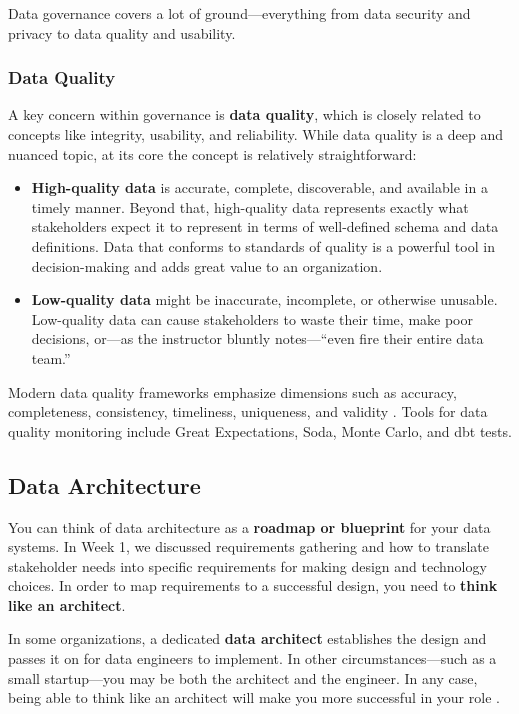 \documentclass{article}
\begin{document}
Data governance covers a lot of ground---everything from data security and privacy to data quality and usability.

\subsubsection{Data Quality}
A key concern within governance is \textbf{data quality}, which is closely related to concepts like integrity, usability, and reliability. While data quality is a deep and nuanced topic, at its core the concept is relatively straightforward:
\begin{itemize}
    \item \textbf{High-quality data} is accurate, complete, discoverable, and available in a timely manner. Beyond that, high-quality data represents exactly what stakeholders expect it to represent in terms of well-defined schema and data definitions. Data that conforms to standards of quality is a powerful tool in decision-making and adds great value to an organization.
    \item \textbf{Low-quality data} might be inaccurate, incomplete, or otherwise unusable. Low-quality data can cause stakeholders to waste their time, make poor decisions, or---as the instructor bluntly notes---``even fire their entire data team.''
\end{itemize}

Modern data quality frameworks emphasize dimensions such as accuracy, completeness, consistency, timeliness, uniqueness, and validity \cite{dama2017dmbok}. Tools for data quality monitoring include Great Expectations, Soda, Monte Carlo, and dbt tests.

\subsection{Data Architecture}
\label{sec:architecture}
You can think of data architecture as a \textbf{roadmap or blueprint} for your data systems. In Week 1, we discussed requirements gathering and how to translate stakeholder needs into specific requirements for making design and technology choices. In order to map requirements to a successful design, you need to \textbf{think like an architect}.

In some organizations, a dedicated \textbf{data architect} establishes the design and passes it on for data engineers to implement. In other circumstances---such as a small startup---you may be both the architect and the engineer. In any case, being able to think like an architect will make you more successful in your role \cite{reis2022fundamentals}.
\end{document}
